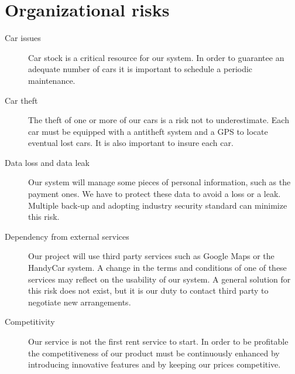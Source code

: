 \section{Organizational risks}
\begin{description}
\item[Car issues] Car stock is a critical resource for our system. In order to guarantee an adequate number of cars it is important to schedule a periodic maintenance.
\item[Car theft] The theft of one or more of our cars is a risk not to underestimate. Each car must be equipped with a antitheft system and a GPS to locate eventual lost cars. It is also important to insure each car.
\item[Data loss and data leak] Our system will manage some pieces of personal information, such as the payment ones. We have to protect these data to avoid a loss or a leak. Multiple back-up and adopting industry security standard can minimize this risk. 
\item[Dependency from external services] Our project will use third party services such as Google Maps or the HandyCar system. A change in the terms and conditions of one of these services may reflect on the usability of our system. A general solution for this risk does not exist, but it is our duty to contact third party to negotiate new arrangements. 
\item[Competitivity] Our service is not the first rent service to start. In order to be profitable the competitiveness of our product must be continuously enhanced by introducing innovative features and by keeping our prices competitive.
\end{description}